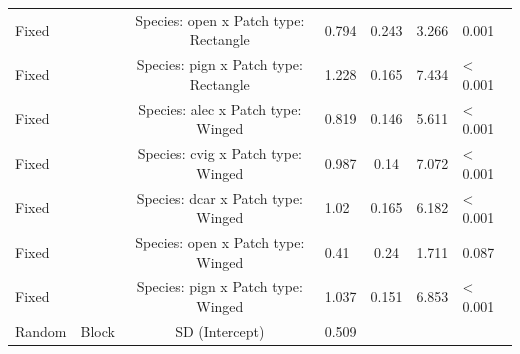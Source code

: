\documentclass[
  man, donotrepeattitle]{apa6}
\begin{document}
\begin{landscape}
\begin{table}[!h]
{\begin{tabular}[t]{lcclccl}
Fixed &  & Species: open x Patch type: Rectangle & 0.794 & 0.243 & 3.266 & 0.001\\
Fixed &  & Species: pign x Patch type: Rectangle & 1.228 & 0.165 & 7.434 & < 0.001\\
Fixed &  & Species: alec x Patch type: Winged & 0.819 & 0.146 & 5.611 & < 0.001\\
Fixed &  & Species: cvig x Patch type: Winged & 0.987 & 0.14 & 7.072 & < 0.001\\
Fixed &  & Species: dcar x Patch type: Winged & 1.02 & 0.165 & 6.182 & < 0.001\\
Fixed &  & Species: open x Patch type: Winged & 0.41 & 0.24 & 1.711 & 0.087\\
Fixed &  & Species: pign x Patch type: Winged & 1.037 & 0.151 & 6.853 & < 0.001\\
Random & Block & SD (Intercept) & 0.509 &  &  & \\
\bottomrule
\end{tabular}}
\end{table}

\end{landscape}
\newpage

\begin{table}[!h]
\centering
\caption{\label{tab:Table-M-rich}Linear mixed effects model of species richness by patch type.}
\centering
{}
\end{table}

\newpage
\end{document}
